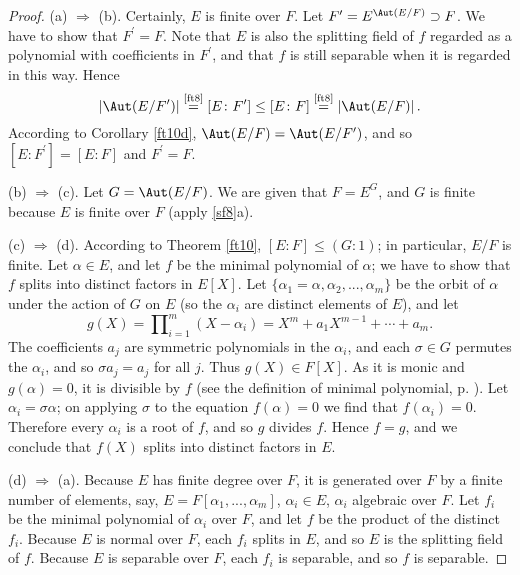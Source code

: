 \documentclass[a4paper,11pt,final,openany]{memoir}
\theoremstyle{nonumberplain}
\newtheorem{proof}{Proof.}
\begin{document}
\begin{proof}
(a) $\Rightarrow$ (b). Certainly, $E$ is finite over $F$. Let $F^{\prime
}=E^{\Aut(E/F)}\supset F$. We have to show that $F^{\prime}=F$. Note that $E$
is also the splitting field of $f$ regarded as a polynomial with coefficients
in $F^{\prime}$, and that $f$ is still separable when it is regarded in this
way. Hence
\[
\left\vert \Aut(E/F^{\prime})\right\vert \overset{\text{\ref{ft8}}}{=}[E\colon
F^{\prime}]\leq\lbrack E\colon F]\overset{\text{\ref{ft8}}}{=}\left\vert
\Aut(E/F)\right\vert .
\]
According to Corollary \ref{ft10d}, $\Aut(E/F)=\Aut(E/F^{\prime})$, and so
$[E\colon F^{\prime}]=[E\colon F]$ and $F^{\prime}=F$.

(b) $\Rightarrow$ (c). Let $G=\Aut(E/F)$. We are given that $F=E^{G}$, and $G$
is finite because $E$ is finite over $F$ (apply \ref{sf8}a).

(c) $\Rightarrow$ (d). According to Theorem \ref{ft10}, $[E\colon
F]\leq(G\colon1)$; in particular, $E/F$ is finite. Let $\alpha\in E$, and let
$f$ be the minimal polynomial of $\alpha$; we have to show that $f$ splits
into distinct factors in $E[X]$. Let $\{\alpha_{1}=\alpha,\alpha
_{2},...,\alpha_{m}\}$ be the orbit of $\alpha$ under the action of $G$ on $E$
(so the $\alpha_{i}$ are distinct elements of $E$), and let
\[
g(X)=\prod\nolimits_{i=1}^{m}(X-\alpha_{i})=X^{m}+a_{1}X^{m-1}+\cdots+a_{m}.
\]
The coefficients $a_{j}$ are symmetric polynomials in the $\alpha_{i}$, and
each $\sigma\in G$ permutes the $\alpha_{i}$, and so $\sigma a_{j}=a_{j}$ for
all $j$. Thus $g(X)\in F[X]$. As it is monic and $g(\alpha)=0$, it is
divisible by $f$ (see the definition of minimal polynomial, p.\thinspace
\pageref{minimal}). Let $\alpha_{i}=\sigma\alpha$; on applying $\sigma$ to the
equation $f(\alpha)=0$ we find that $f(\alpha_{i})=0$. Therefore every
$\alpha_{i}$ is a root of $f$, and so $g$ divides $f$. Hence $f=g$, and we
conclude that $f(X)$ splits into distinct factors in $E$.

(d) $\Rightarrow$ (a). Because $E$ has finite degree over $F$, it is generated
over $F$ by a finite number of elements, say, $E=F[\alpha_{1},...,\alpha_{m}%
]$, $\alpha_{i}\in E$, $\alpha_{i}$ algebraic over $F$. Let $f_{i}$ be the
minimal polynomial of $\alpha_{i}$ over $F$, and let $f$ be the product of the
distinct $f_{i}$. Because $E$ is normal over $F$, each $f_{i}$ splits in $E$,
and so $E$ is the splitting field of $f.$ Because $E$ is separable over $F$,
each $f_{i}$ is separable, and so $f$ is separable.
\end{proof}
\end{document}
